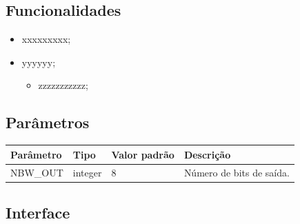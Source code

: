 \documentclass[a4paper]{article}
\begin{document}
\subsection{Funcionalidades}

\begin{itemize}
    \item xxxxxxxxx;
    \item yyyyyy;
    \begin{itemize}
        \item zzzzzzzzzzz;
    \end{itemize}
\end{itemize}

\subsection{Parâmetros}

\begin{longtable}{|l|l|l|l|}
\hline
\rowcolor[HTML]{27378F} 
{\color[HTML]{FFFFFF} Parâmetro} & {\color[HTML]{FFFFFF} Tipo} & {\color[HTML]{FFFFFF} Valor padrão} & {\color[HTML]{FFFFFF} Descrição}                                                                                        \\ \hline
NBW\_OUT                         & integer                     & 8                                   & Número de bits de saída.                                                                                       \\ \hline
\end{longtable}

\subsection{Interface}
\end{document}
